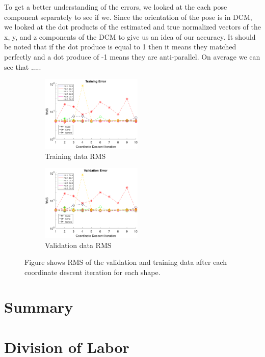 \documentclass[journal]{IEEEtran}
\begin{document}
To get a better understanding of the errors, we looked at the each pose component separately to see if we. Since the orientation of the pose is in DCM, we looked at the dot products of the estimated  and true normalized vectors of the x, y, and z components of the DCM to give us an idea of our accuracy. It should be noted that if the dot produce is equal to 1 then it means they matched perfectly and a dot produce of -1 means they are anti-parallel. On average we can see that  .....

\begin{figure}
	\hspace{-10 ex}
	\begin{subfigure}{.3\textwidth}
		\centering
		\includegraphics[width=1.9in]{train_coord_descent_plot}
		\caption{Training data RMS}
		\label{fig:train_coord_desc}
	\end{subfigure}%
	\begin{subfigure}{.3\textwidth}
		\centering
		\includegraphics[width=1.9in]{val_coord_descent_plot}
		\caption{Validation data RMS}
		\label{fig:val_coord_desc}
	\end{subfigure}
	\caption{Figure shows RMS of the validation and training data after each coordinate descent iteration for each shape.}
	\label{Fig:cone_performance}
\end{figure}


\section{Summary}

\section{Division of Labor}
\end{document}
